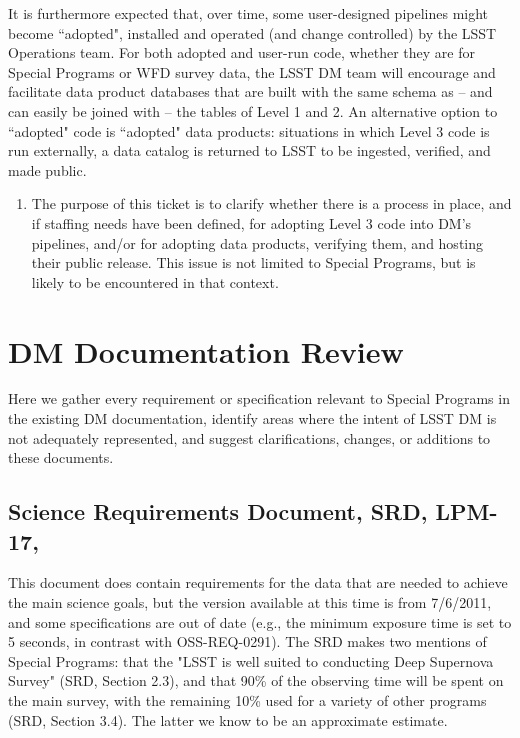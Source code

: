 \documentclass[DM,lsstdraft,toc]{lsstdoc}
\begin{document}
It is furthermore expected that, over time, some user-designed pipelines might become ``adopted", installed and operated (and change controlled) by the LSST Operations team. For both adopted and user-run code, whether they are for Special Programs or WFD survey data, the LSST DM team will encourage and facilitate data product databases that are built with the same schema as -- and can easily be joined with -- the tables of Level 1 and 2. An alternative option to ``adopted" code is ``adopted" data products: situations in which Level 3 code is run externally, a data catalog is returned to LSST to be ingested, verified, and made public.

\begin{enumerate}[resume,topsep=-10pt,after=\vspace{10pt},label= \textbf{Action \Roman*}] \item \label{L3-2} The purpose of this ticket is to clarify whether there is a process in place, and if staffing needs have been defined, for adopting Level 3 code into DM's pipelines, and/or for adopting data products, verifying them, and hosting their public release. This issue is not limited to Special Programs, but is likely to be encountered in that context. \end{enumerate}



\clearpage
\section{DM Documentation Review}\label{sec:docrev}

Here we gather every requirement or specification relevant to Special Programs in the existing DM documentation, identify areas where the intent of LSST DM is not adequately represented, and suggest clarifications, changes, or additions to these documents.

\subsection{Science Requirements Document, SRD, LPM-17, \cite{LPM-17}}\label{ssec:docrev_srd}

This document does contain requirements for the data that are needed to achieve the main science goals, but the version available at this time is from 7/6/2011, and some specifications are out of date (e.g., the minimum exposure time is set to 5 seconds, in contrast with OSS-REQ-0291). The SRD makes two mentions of Special Programs: that the "LSST is well suited to conducting Deep Supernova Survey" (SRD, Section 2.3), and that 90\% of the observing time will be spent on the main survey, with the remaining 10\% used for a variety of other programs (SRD, Section 3.4). The latter we know to be an approximate estimate.
\end{document}
